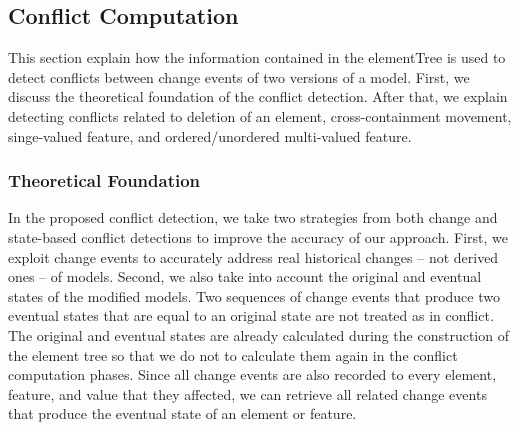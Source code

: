 \subsection{Conflict Computation} 
\label{sec:conflict_computation} 
This section explain how the information contained in the \textsf{elementTree} is used to detect conflicts between change events of two versions of a model. First, we discuss the theoretical foundation of the conflict detection. After that, we explain detecting conflicts related to deletion of an element, cross-containment movement, singe-valued feature, and ordered/unordered multi-valued feature. 

\subsubsection{Theoretical Foundation} 
\label{sec:theoretical_foundation}
In the proposed conflict detection, we take two strategies from both change and state-based conflict detections to improve the accuracy of our approach. 
First, we exploit change events to accurately address real historical changes -- not derived ones -- of models. Second, we also take into account the original and eventual states of the modified models. Two sequences of change events that produce two eventual states that are equal to an original state are not treated as in conflict. The original and eventual states are already calculated during the construction of the \textsf{element tree} so that we do not to calculate them again in the conflict computation phases. Since all change events are also recorded to every element, feature, and value that they affected, we can retrieve all related change events that produce the eventual state of an element or feature. 

